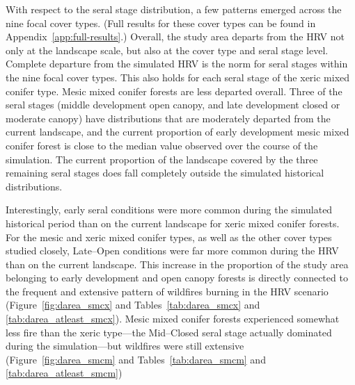 With respect to the seral stage distribution, a few patterns emerged across the nine focal cover types. (Full results for these cover types can be found in Appendix~\ref{app:full-results}.) Overall, the study area departs from the HRV not only at the landscape scale, but also at the cover type and seral stage level. Complete departure from the simulated HRV is the norm for seral stages within the nine focal cover types. This also holds for each seral stage of the xeric mixed conifer type. Mesic mixed conifer forests are less departed overall. Three of the seral stages (middle development open canopy, and late development closed or moderate canopy) have distributions that are moderately departed from the current landscape, and the current proportion of early development mesic mixed conifer forest is close to the median value observed over the course of the simulation. The current proportion of the landscape covered by the three remaining seral stages does fall completely outside the simulated historical distributions.

Interestingly, early seral conditions were more common during the simulated historical period than on the current landscape for xeric mixed conifer forests. For the mesic and xeric mixed conifer types, as well as the other cover types studied closely, Late--Open conditions were far more common during the HRV than on the current landscape. This increase in the proportion of the study area belonging to early development and open canopy forests is directly connected to the frequent and extensive pattern of wildfires burning in the HRV scenario (Figure~\ref{fig:darea_smcx} and Tables~\ref{tab:darea_smcx} and \ref{tab:darea_atleast_smcx}). Mesic mixed conifer forests experienced somewhat less fire than the xeric type---the Mid--Closed seral stage actually dominated during the simulation---but wildfires were still extensive (Figure~\ref{fig:darea_smcm} and Tables~\ref{tab:darea_smcm} and \ref{tab:darea_atleast_smcm})



